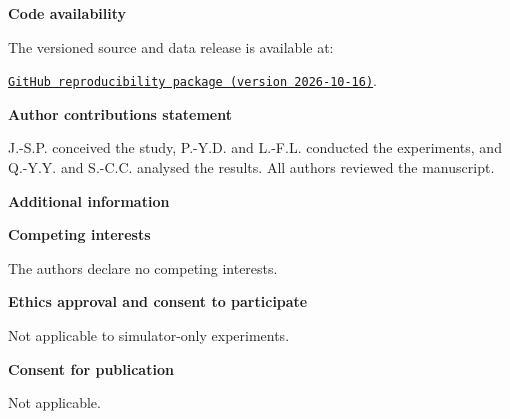 \documentclass[pdflatex,sn-mathphys-num]{sn-jnl}
\newcommand{\GitHubURL}{%
  \href{https://github.com/dpy3/A-User-Satisfaction-Oriented-Task-Segmentation-Scheme-for-Joint-Communication-and-Task-Offloading/tree/main/Cluster_Computing_Reproducibility_2026-10-16}{\texttt{GitHub reproducibility package (version 2026-10-16)}}}
\begin{document}
\noindent\textbf{Code availability}\par
The versioned source and data release is available at:\par
\GitHubURL.\par\medskip

\noindent\textbf{Author contributions statement}\par
J.-S.P. conceived the study, P.-Y.D. and L.-F.L. conducted the experiments, and Q.-Y.Y. and S.-C.C. analysed the results. All authors reviewed the manuscript.
\par\medskip

\noindent\textbf{Additional information}\par
\noindent\textbf{Competing interests}\par
The authors declare no competing interests.
\par\medskip

\noindent\textbf{Ethics approval and consent to participate}\par
Not applicable to simulator-only experiments.
\par\medskip

\noindent\textbf{Consent for publication}\par
Not applicable.


\end{document}
